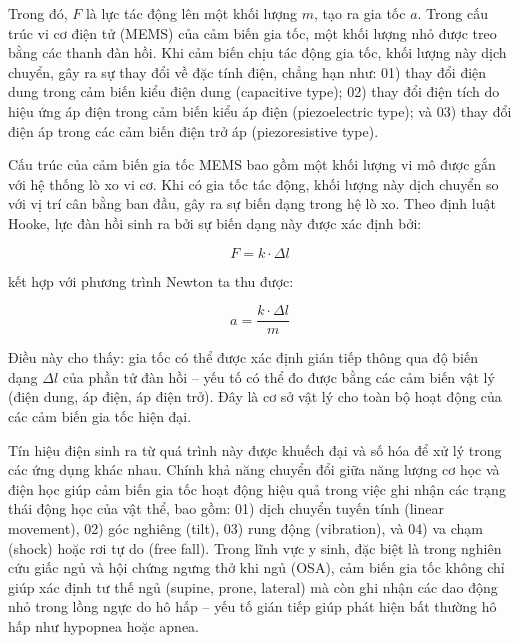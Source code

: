 Trong đó, $F$ là lực tác động lên một khối lượng $m$, tạo ra gia tốc $a$. Trong cấu trúc vi cơ điện tử (MEMS) của cảm biến gia tốc, một khối lượng nhỏ được treo bằng các thanh đàn hồi. Khi cảm biến chịu tác động gia tốc, khối lượng này dịch chuyển, gây ra sự thay đổi về đặc tính điện, chẳng hạn như: 01) thay đổi điện dung trong cảm biến kiểu điện dung (capacitive type); 02) thay đổi điện tích do hiệu ứng áp điện trong cảm biến kiểu áp điện (piezoelectric type); và 03) thay đổi điện áp trong các cảm biến điện trở áp (piezoresistive type).

Cấu trúc của cảm biến gia tốc MEMS bao gồm một khối lượng vi mô được 
gắn với hệ thống lò xo vi cơ. Khi có gia tốc tác động, 
khối lượng này dịch chuyển so với vị trí cân bằng ban đầu, 
gây ra sự biến dạng trong hệ lò xo. 
Theo định luật Hooke, lực đàn hồi sinh ra bởi sự biến dạng này 
được xác định bởi:

\begin{equation}
F = k \cdot \Delta l
\end{equation}

kết hợp với phương trình Newton ta thu được:

\begin{equation}
a = \frac{k \cdot \Delta l}{m}
\end{equation}

Điều này cho thấy: gia tốc có thể được xác định gián tiếp thông qua 
độ biến dạng $\Delta l$ của phần tử đàn hồi – yếu tố có thể đo được 
bằng các cảm biến vật lý (điện dung, áp điện, áp điện trở). 
Đây là cơ sở vật lý cho toàn bộ hoạt động của các cảm biến gia 
tốc hiện đại.

Tín hiệu điện sinh ra từ quá trình này được khuếch đại và số hóa để xử lý trong các 
ứng dụng khác nhau. Chính khả năng chuyển đổi giữa năng lượng 
cơ học và điện học giúp cảm biến gia tốc hoạt động hiệu quả 
trong việc ghi nhận các trạng thái động học của vật thể, 
bao gồm: 01) dịch chuyển tuyến tính (linear movement), 
02) góc nghiêng (tilt), 03) rung động (vibration), 
và 04) va chạm (shock) hoặc rơi tự do (free fall).
Trong lĩnh vực y sinh, đặc biệt là trong nghiên cứu giấc ngủ và 
hội chứng ngưng thở khi ngủ (OSA), cảm biến gia tốc không chỉ 
giúp xác định tư thế ngủ (supine, prone, lateral) mà còn 
ghi nhận các dao động nhỏ trong lồng ngực do hô hấp – 
yếu tố gián tiếp giúp phát hiện bất thường hô hấp như 
hypopnea hoặc apnea.


